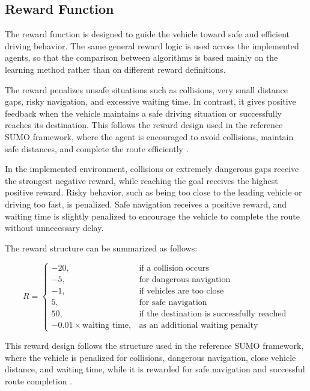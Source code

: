 \documentclass{article}
\begin{document}
\subsection{Reward Function}

The reward function is designed to guide the vehicle toward safe and efficient driving behavior. The same general reward logic is used across the implemented agents, so that the comparison between algorithms is based mainly on the learning method rather than on different reward definitions.

The reward penalizes unsafe situations such as collisions, very small distance gaps, risky navigation, and excessive waiting time. In contrast, it gives positive feedback when the vehicle maintains a safe driving situation or successfully reaches its destination. This follows the reward design used in the reference SUMO framework, where the agent is encouraged to avoid collisions, maintain safe distances, and complete the route efficiently \cite{maad2025dynamic}.

In the implemented environment, collisions or extremely dangerous gaps receive the strongest negative reward, while reaching the goal receives the highest positive reward. Risky behavior, such as being too close to the leading vehicle or driving too fast, is penalized. Safe navigation receives a positive reward, and waiting time is slightly penalized to encourage the vehicle to complete the route without unnecessary delay.

The reward structure can be summarized as follows:

\[
R =
\begin{cases}
-20, & \text{if a collision occurs} \\
-5, & \text{for dangerous navigation} \\
-1, & \text{if vehicles are too close} \\
5, & \text{for safe navigation} \\
50, & \text{if the destination is successfully reached} \\
-0.01 \times \text{waiting time}, & \text{as an additional waiting penalty}
\end{cases}
\]


This reward design follows the structure used in the reference SUMO framework, where the vehicle is penalized for collisions, dangerous navigation, close vehicle distance, and waiting time, while it is rewarded for safe navigation and successful route completion \cite{maad2025dynamic}.
\end{document}
